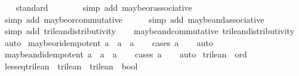 \begin{isabellebody}
\isanewline
{}\isamarkupfalse%
\isanewline
%
\isadelimproof
\ \ %
\endisadelimproof
%
\isatagproof
{}\isamarkupfalse%
\ standard\isanewline
\ \ \ \ \ \ \isamarkupfalse%
\ {\isacharparenleft}simp\ add{\isacharcolon}\ maybe{\isacharunderscore}or{\isacharunderscore}associative{\isacharparenright}\isanewline
\ \ \ \ \ \isamarkupfalse%
\ {\isacharparenleft}simp\ add{\isacharcolon}\ maybe{\isacharunderscore}or{\isacharunderscore}commutative{\isacharparenright}\isanewline
\ \ \ \ \isamarkupfalse%
\ {\isacharparenleft}simp\ add{\isacharcolon}\ maybe{\isacharunderscore}and{\isacharunderscore}associative{\isacharparenright}\isanewline
\ \ \ \isamarkupfalse%
\ {\isacharparenleft}simp\ add{\isacharcolon}\ trilean{\isacharunderscore}distributivity{\isacharparenright}\isanewline
\ \ \isamarkupfalse%
\ maybe{\isacharunderscore}and{\isacharunderscore}commutative\ trilean{\isacharunderscore}distributivity\ \isamarkupfalse%
\ auto%
\endisatagproof
{\isafoldproof}%
%
\isadelimproof
\isanewline
%
\endisadelimproof
{}\isamarkupfalse%
\isanewline
\isanewline
{}\isamarkupfalse%
\ maybe{\isacharunderscore}or{\isacharunderscore}idempotent{\isacharcolon}\ {\isachardoublequoteopen}a\ {\isasymor}\isactrlsub {\isacharquery}\ a\ {\isacharequal}\ a{\isachardoublequoteclose}\isanewline
%
\isadelimproof
\ \ %
\endisadelimproof
%
\isatagproof
{}\isamarkupfalse%
\ {\isacharparenleft}cases\ a{\isacharparenright}\isanewline
\ \ \isamarkupfalse%
\ auto%
\endisatagproof
{\isafoldproof}%
%
\isadelimproof
\isanewline
%
\endisadelimproof
\isanewline
{}\isamarkupfalse%
\ maybe{\isacharunderscore}and{\isacharunderscore}idempotent{\isacharcolon}\ {\isachardoublequoteopen}a\ {\isasymand}\isactrlsub {\isacharquery}\ a\ {\isacharequal}\ a{\isachardoublequoteclose}\isanewline
%
\isadelimproof
\ \ %
\endisadelimproof
%
\isatagproof
{}\isamarkupfalse%
\ {\isacharparenleft}cases\ a{\isacharparenright}\isanewline
\ \ \isamarkupfalse%
\ auto%
\endisatagproof
{\isafoldproof}%
%
\isadelimproof
\isanewline
%
\endisadelimproof
\isanewline
{}\isamarkupfalse%
\ trilean\ {\isacharcolon}{\isacharcolon}\ ord\ \isanewline
{}\isamarkupfalse%
\ less{\isacharunderscore}eq{\isacharunderscore}trilean\ {\isacharcolon}{\isacharcolon}\ {\isachardoublequoteopen}trilean\ {\isasymRightarrow}\ trilean\ {\isasymRightarrow}\ bool{\isachardoublequoteclose}\ \isanewline

\end{isabellebody}
